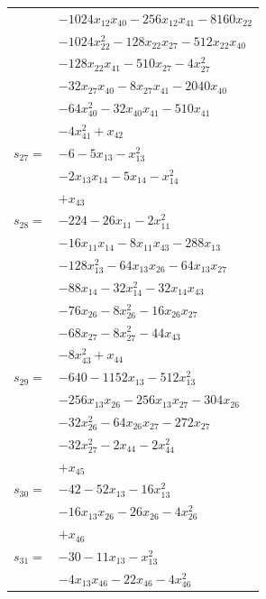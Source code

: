 \begin{longtable}{@{}r@{\;}l@{}}
 & \(\displaystyle -1024x_{12}x_{40} -256x_{12}x_{41} -8160x_{22}\) \\
 & \(\displaystyle -1024x_{22}^{2} -128x_{22}x_{27} -512x_{22}x_{40}\) \\
 & \(\displaystyle -128x_{22}x_{41} -510x_{27} -4x_{27}^{2}\) \\
 & \(\displaystyle -32x_{27}x_{40} -8x_{27}x_{41} -2040x_{40}\) \\
 & \(\displaystyle -64x_{40}^{2} -32x_{40}x_{41} -510x_{41}\) \\
 & \(\displaystyle -4x_{41}^{2} +x_{42}\) \\[3pt]
\(s_{27}=\) & \(\displaystyle -6 -5x_{13} -x_{13}^{2}\) \\
 & \(\displaystyle -2x_{13}x_{14} -5x_{14} -x_{14}^{2}\) \\
 & \(\displaystyle +x_{43}\) \\[3pt]
\(s_{28}=\) & \(\displaystyle -224 -26x_{11} -2x_{11}^{2}\) \\
 & \(\displaystyle -16x_{11}x_{14} -8x_{11}x_{43} -288x_{13}\) \\
 & \(\displaystyle -128x_{13}^{2} -64x_{13}x_{26} -64x_{13}x_{27}\) \\
 & \(\displaystyle -88x_{14} -32x_{14}^{2} -32x_{14}x_{43}\) \\
 & \(\displaystyle -76x_{26} -8x_{26}^{2} -16x_{26}x_{27}\) \\
 & \(\displaystyle -68x_{27} -8x_{27}^{2} -44x_{43}\) \\
 & \(\displaystyle -8x_{43}^{2} +x_{44}\) \\[3pt]
\(s_{29}=\) & \(\displaystyle -640 -1152x_{13} -512x_{13}^{2}\) \\
 & \(\displaystyle -256x_{13}x_{26} -256x_{13}x_{27} -304x_{26}\) \\
 & \(\displaystyle -32x_{26}^{2} -64x_{26}x_{27} -272x_{27}\) \\
 & \(\displaystyle -32x_{27}^{2} -2x_{44} -2x_{44}^{2}\) \\
 & \(\displaystyle +x_{45}\) \\[3pt]
\(s_{30}=\) & \(\displaystyle -42 -52x_{13} -16x_{13}^{2}\) \\
 & \(\displaystyle -16x_{13}x_{26} -26x_{26} -4x_{26}^{2}\) \\
 & \(\displaystyle +x_{46}\) \\[3pt]
\(s_{31}=\) & \(\displaystyle -30 -11x_{13} -x_{13}^{2}\) \\
 & \(\displaystyle -4x_{13}x_{46} -22x_{46} -4x_{46}^{2}\) \\

\end{longtable}
